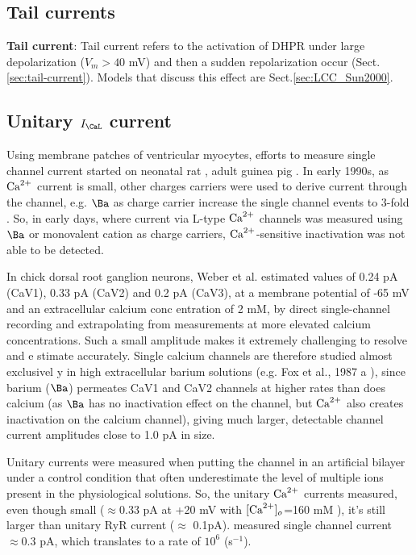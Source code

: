 \subsection{Tail currents}
\label{sec:tail_current-Ca2+-channel}

{\bf Tail current}: Tail current refers to the activation of DHPR under large
depolarization ($V_m>40$ mV) and then a sudden repolarization occur
(Sect.\ref{sec:tail-current}).
Models that discuss this effect are Sect.\ref{sec:LCC_Sun2000}. 


\subsection{Unitary $I_\CaL$ current}
\label{sec:unit-i_cal-curr}


Using membrane patches of ventricular myocytes, efforts to measure single
channel current started on neonatal rat \citep{reuter1982}, adult guinea pig
\citep{cavalie1983, hess1984, trautwein1985}. In early 1990s, as ${\text{Ca}^{2+}}$ current
is small, other charges carriers were used to derive current through the
channel, e.g. $\Ba$ as charge carrier increase the single channel events to
3-fold \citep{yue1990}. So, in early days, where current via L-type ${\text{Ca}^{2+}}$
channels was measured using $\Ba$ or monovalent cation as charge carriers,
${\text{Ca}^{2+}}$-sensitive inactivation was not able to be detected.


In chick dorsal root ganglion neurons, Weber et al.  estimated values of 0.24 pA
(CaV1), 0.33 pA (CaV2) and 0.2 pA (CaV3), at a membrane potential of -65 mV and
an extracellular calcium conc entration of 2 mM, by direct single-channel
recording and extrapolating from measurements at more elevated calcium
concentrations. Such a small  amplitude  makes  it  extremely challenging  to
resolve  and  e stimate  accurately.
Single calcium channels are therefore studied almost exclusivel y in high
extracellular barium  solutions  (e.g.  Fox et  al.,  1987 a ),  since  barium
($\Ba$) permeates  CaV1  and  CaV2 channels  at  higher rates  than  does 
calcium (as $\Ba$ has no inactivation effect on the channel, but ${\text{Ca}^{2+}}$ also
creates inactivation on the calcium channel), giving much larger, detectable
channel current amplitudes close to 1.0 pA in size.

Unitary currents were measured when putting the channel in an artificial bilayer
under a control condition that often underestimate the level of multiple ions
present in the physiological solutions. So, the unitary ${\text{Ca}^{2+}}$ currents measured,
even though small ($\approx$0.33 pA at +20 mV with $[{\text{Ca}^{2+}}]_o$=160 mM
\citep{yue1990}), it's still larger than unitary RyR current ($\approx$ 0.1pA).
\citep{wang2001} measured single channel current $\approx 0.3$ pA, which
translates to a rate of $10^6$ (s$^{-1}$).


